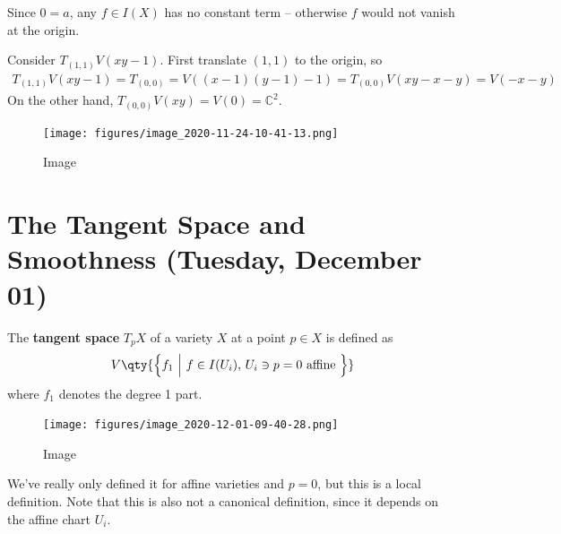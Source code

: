 \begin{remark}

Since \(0=a\), any \(f\in I(X)\) has no constant term -- otherwise \(f\)
would not vanish at the origin.

\end{remark}

\begin{example}[?]

Consider \(T_{(1, 1)} V(xy-1)\). First translate \((1, 1)\) to the
origin, so
\begin{align*}
T_{(1, 1)} V(xy-1) = T_{(0, 0)} = V((x-1)(y-1) - 1) = T_{(0, 0)} V(xy-x-y) = V(-x-y)
\end{align*}
On the other hand, \(T_{(0, 0)} V(xy) = V(0) = {\mathbb{C}}^2\).

\begin{figure}
\centering
\texttt{[image: figures/image\_2020-11-24-10-41-13.png]}
\caption{Image}
\end{figure}

\end{example}

\hypertarget{the-tangent-space-and-smoothness-tuesday-december-01}{%
\section{The Tangent Space and Smoothness (Tuesday, December
01)}\label{the-tangent-space-and-smoothness-tuesday-december-01}}

\begin{definition}

The \textbf{tangent space} \(T_p X\) of a variety \(X\) at a point
\(p\in X\) is defined as
\begin{align*}
V\qty{\left\{{f_1 {~\mathrel{\Big|}~}f\in I(U_i),\, U_i \ni p = 0 \text{ affine } }\right\}}
\end{align*}
where \(f_1\) denotes the degree 1 part.

\begin{figure}
\centering
\texttt{[image: figures/image\_2020-12-01-09-40-28.png]}
\caption{Image}
\end{figure}

\end{definition}

\begin{remark}

We've really only defined it for affine varieties and \(p=0\), but this
is a local definition. Note that this is also not a canonical
definition, since it depends on the affine chart \(U_i\).

\end{remark}

